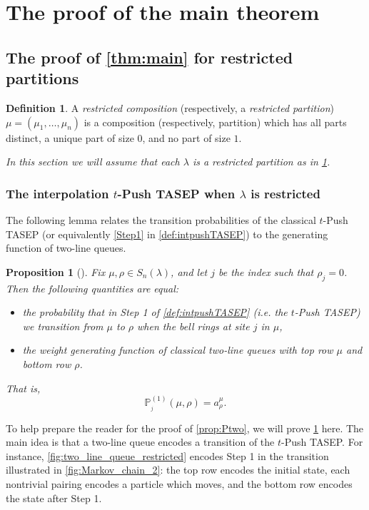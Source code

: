 \documentclass[12pt]{amsart}
\newtheorem{prop}[thm]{Proposition}
\theoremstyle{definition}
\newtheorem{definition}[thm]{Definition}
\newcommand{\PPone}[1]{\mathbb P^{(1)}_{#1}}
\begin{document}
\section{The proof of the main theorem}\label{sec:proof}
\subsection{The proof of \texorpdfstring{\cref{thm:main}}{the main theorem} for restricted partitions}



\begin{definition}\label{def:restricted}
    A \emph{restricted composition}
    (respectively, a \emph{restricted partition}) $\mu=(\mu_1,\dots,\mu_n)$ is a composition (respectively, partition)
    which has all parts distinct, a unique part of size $0$, and no part of size $1$.
\end{definition}

\emph{In this section we will assume that each $\lambda$ is a restricted partition as in \cref{def:restricted}.}
\subsubsection{The interpolation \texorpdfstring{$t$}{t}-Push TASEP when $\lambda$ is restricted}





The following lemma relates the transition probabilities of the classical $t$-Push TASEP (or equivalently \ref{Step1} in \cref{def:intpushTASEP}) to the generating function of two-line queues.


\begin{prop}[{\cite[Lemma 5.4]{AyyerMartinWilliams2025}}]\label{prop:Pone}
Fix $\mu,\rho\in S_n(\lambda)$, and let $j$ be the index such that $\rho_j=0$.  Then the following quantities are equal:
\begin{itemize}
\item the probability that in 
Step 1 of \cref{def:intpushTASEP} (i.e. the $t$-Push TASEP) we transition from $\mu$ to $\rho$ when the bell rings at site $j$ in $\mu$,
\item the weight generating function of classical
two-line queues with top row $\mu$ and bottom row $\rho$.
\end{itemize}
That is,
$$\PPone{_j}(\mu,\rho)=a^\mu_{\rho}.$$
\end{prop}


To help prepare the reader for the proof of \cref{prop:Ptwo}, we 
will prove \cref{prop:Pone} here.  The main idea  is that
a two-line queue encodes a transition of the $t$-Push TASEP.  For instance, \cref{fig:two_line_queue_restricted} encodes 
Step 1 in the transition illustrated in \cref{fig:Markov_chain_2}:
the top row encodes the initial state, each nontrivial pairing encodes a particle which moves, and 
the bottom row encodes the state after Step 1.
\end{document}
